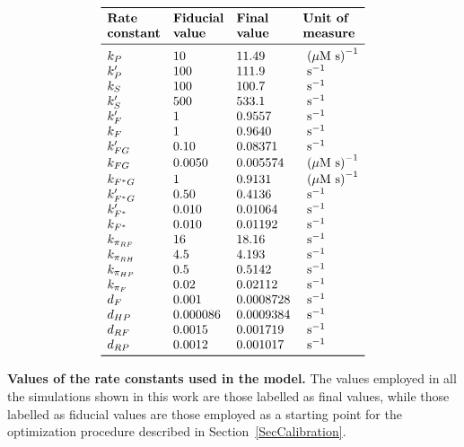 \documentclass[oneside, 10pt, a4paper, twocolumn]{article}
\begin{document}
\begin{table}[h!]
\[\begin{array}{llll}
\toprule
    \text{\textbf{Rate}} & \text{\textbf{Fiducial}}  & \text{\textbf{Final}} & \text{\textbf{Unit of}}\\
        \text{\textbf{constant}} & \text{\textbf{value}}  & \text{\textbf{value}} & \text{\textbf{measure}}\\
\midrule
    k_P          & 10       & 11.49 & \text{ ($\mu$M s)}^{-1} \\
    k_P'         & 100      & 111.9 & \text{ s}^{-1}         \\
    k_S          & 100      & 100.7 & \text{ s}^{-1}          \\
    k_S'         & 500      & 533.1 & \text{ s}^{-1}          \\
    k_F'         & 1        & 0.9557 & \text{ s}^{-1}          \\
    k_F          & 1        & 0.9640 & \text{ {s}}^{-1} \\
    k_{FG}'      & 0.10     & 0.08371 & \text{ s}^{-1}          \\
    k_{FG}       & 0.0050   & 0.005574 & \text{ ($\mu$M s)}^{-1} \\
    k_{F^*G}     & 1        & 0.9131 & \text{ ($\mu$M s)}^{-1} \\
    k_{F^*G}'    & 0.50     & 0.4136 & \text{ s}^{-1}          \\
    k_{F^*}'     & 0.010    & 0.01064 & \text{ s}^{-1}          \\
    k_{F^*}      & 0.010    &  0.01192 & \text{ s}^{-1}          \\
    k_{\pi_{RF}} & 16       & 18.16 & \text{ s}^{-1}          \\
    k_{\pi_{RH}} & 4.5      & 4.193 & \text{ s}^{-1}          \\
    k_{\pi_{HP}} & 0.5      & 0.5142 & \text{ s}^{-1}          \\
    k_{\pi_F}    & 0.02     & 0.02112 & \text{ s}^{-1}          \\
    d_{F}        & 0.001    & 0.0008728 & \text{ s}^{-1}          \\
    d_{HP}       & 0.000086 & 0.0009384 & \text{ s}^{-1}          \\
    d_{RF}       & 0.0015   & 0.001719 & \text{ s}^{-1}          \\
    d_{RP}       & 0.0012   & 0.001017 & \text{ s}^{-1}          \\
\bottomrule
\end{array}\]
\caption{\textbf{Values of the rate constants used in the model.} The values employed in all the simulations shown in this work are those labelled as final values, while those labelled as fiducial values are those employed as a starting point for the optimization procedure described in Section~\ref{SecCalibration}.}\label{TabKs}
\end{table}
\end{document}
